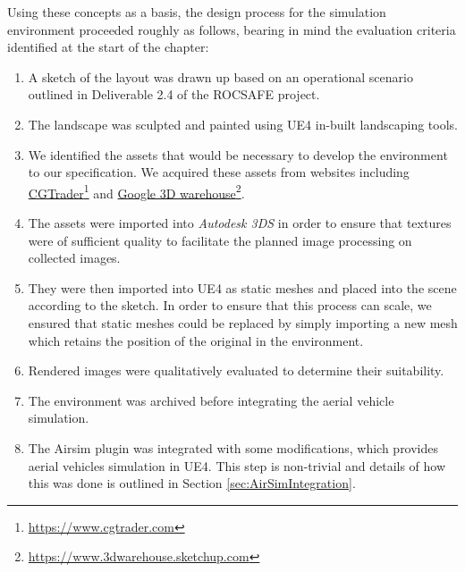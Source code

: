 Using these concepts as a basis, the design process for the simulation environment proceeded roughly as follows, bearing in mind the evaluation criteria identified at the start of the chapter:
\begin{enumerate}
    \item A sketch of the layout was drawn up based on an operational scenario outlined in Deliverable 2.4 of the ROCSAFE project.
    \item The landscape was sculpted and painted using UE4 in-built landscaping tools.
    \item We identified the assets that would be necessary to develop the environment to our specification. We acquired these assets from websites including 
\href{http://www.cgtrader.com}{CGTrader}\footnote{\href {http://www.cgtrader.com}{https://www.cgtrader.com}}
and 
\href{https://3dwarehouse.sketchup.com/?hl=en}{Google 3D warehouse}\footnote{\href {https://3dwarehouse.sketchup.com/?hl=en}{https://www.3dwarehouse.sketchup.com}}.
\item The assets were imported into \emph{Autodesk 3DS} in order to ensure that textures were of sufficient quality to facilitate the planned image processing on collected images.
\item They were then imported into UE4 as static meshes and placed into the scene according to the sketch. In order to ensure that this process can scale, we ensured that static meshes could be replaced by simply importing a new mesh which retains the position of the original in the environment. 
\item Rendered images were qualitatively evaluated to determine their suitability.
\item The environment was archived before integrating the aerial vehicle simulation.
\item The Airsim \cite{Shah2017AirSim:Vehicles} plugin was integrated with some modifications, which provides aerial vehicles simulation in UE4. This step is non-trivial and details of how this was done is outlined in Section \ref{sec:AirSimIntegration}.
\end{enumerate} 


